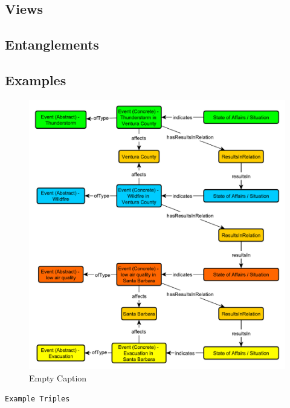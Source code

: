 \subsection{Views}
\label{ssec:views}


\subsection{Entanglements}
\label{ssec:entanglements}


\subsection{Examples}
\label{ssec:examples}
\begin{figure}[h!]
  \begin{center}
    \includegraphics[width=\textwidth]{resources/causal-event-example.pdf}
  \end{center}
  \caption{Empty Caption}
  \label{fig:ov}
\end{figure}\begin{verbatim}
Example Triples
\end{verbatim}

